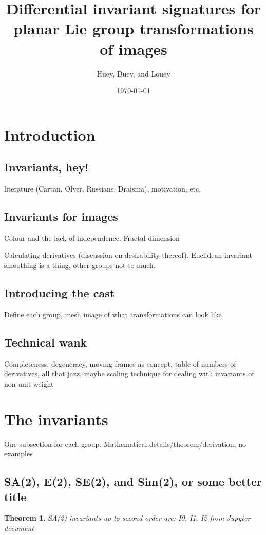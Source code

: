 \documentclass{article}
\title{Differential invariant signatures for planar Lie group transformations of
images}
\date{\today}
\author{Huey, Duey, and Louey}
\newtheorem{theorem}{Theorem}
\begin{document}
\maketitle


\section{Introduction}
\subsection{Invariants, hey!}
literature (Cartan, Olver, Russians, Draisma), motivation, etc,

\subsection{Invariants for images}
Colour and the lack of independence. Fractal dimension 

Calculating derivatives (discussion on desirability thereof).
Euclidean-invariant smoothing is a thing, other groups not so much.

\subsection{Introducing the cast}
Define each group, mesh image of what transformations can look like

\subsection{Technical wank}
Completeness, degeneracy, moving frames as concept, table of numbers of
derivatives, all that jazz, maybe scaling technique
for dealing with invariants of non-unit weight


\section{The invariants}
One subsection for each group. Mathematical details/theorem/derivation, no
examples
\subsection{SA(2), E(2), SE(2), and Sim(2), or some better title}
\begin{theorem}
  SA(2) invariants up to second order are:
  I0, I1, I2 from Jupyter document
\end{theorem}
\end{document}
